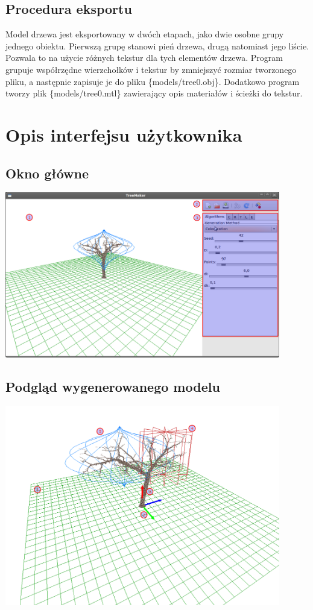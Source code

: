 \subsection{Procedura eksportu}
Model drzewa jest eksportowany w dwóch etapach, jako dwie osobne grupy jednego obiektu. Pierwszą grupę stanowi pień drzewa, drugą natomiast jego liście.
Pozwala to na użycie różnych tekstur dla tych elementów drzewa. Program grupuje współrzędne wierzchołków i tekstur by zmniejszyć rozmiar tworzonego pliku, a następnie
zapisuje je do pliku \{models/tree0.obj\}. Dodatkowo program tworzy plik \{models/tree0.mtl\} zawierający opis materiałów i ścieżki do tekstur. 
\section{Opis interfejsu użytkownika}

\subsection{Okno główne}
\includegraphics[width=120mm]{images/gui/main_window.png}

\subsection{Podgląd wygenerowanego modelu}
\includegraphics[width=120mm]{images/gui/model_view.png}

